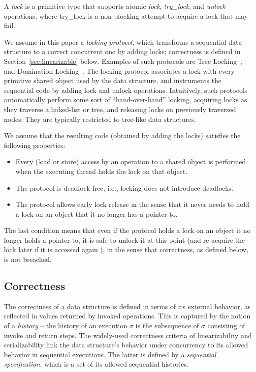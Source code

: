 A \emph{lock} is a primitive type that supports atomic \emph{lock}, \emph{try\_lock}, and \emph{unlock} operations, 
where try\_lock is a non-blocking attempt to acquire a lock that may fail. 

We assume in this paper a \emph{locking protocol}, which transforms a sequential data-structure to a correct concurrent one by adding locks;
correctness is defined in Section~\ref{sec:linearizable} below.
Examples of such protocols are Tree Locking~\cite{SilberschatzK1980}, and Domination Locking~\cite{Gueta2011}. 
The locking protocol associates a lock with every primitive shared object used by the data structure, and instruments the sequential code 
by adding lock and unlock operations. Intuitively, such protocols automatically perform some sort of ``hand-over-hand'' locking, acquiring locks as
they traverse a linked-list or tree, and releasing locks on previously traversed nodes. They are typically restricted to tree-like data structures.


We assume that the resulting code (obtained by adding the locks) satisfies the following properties:

\begin{itemize}
\item Every (load or store) access by an operation to a shared object is performed when the executing thread holds the lock on that object.
\item The protocol is deadlock-free, i.e., locking  does not introduce deadlocks.
\item The protocol allows early lock release in the sense that  it never needs to hold a lock on an object that it no longer has a pointer to.
 \end{itemize}

The last condition means that even if the protocol holds a lock on an object it no longer holds a pointer to, it is safe to unlock it at this point (and re-acquire the lock later if it is accessed again ), in the sense that correctness, as defined below, is not breached.  


\subsection{Correctness}
\label{ssec:linearizable} 

The correctness of a data structure is defined in terms of its external behavior, as reflected in values returned by invoked operations. 
This is captured by the notion of a \emph{history} -- the history of an execution $\sigma$ is the subsequence  of $\sigma$ consisting 
of invoke and return steps. The widely-used correctness criteria of linearizability and serializability link the data structure's behavior under concurrency to its allowed behavior in sequential executions. The latter is defined by a \emph{sequential specification}, which is a set of its allowed sequential histories. 

